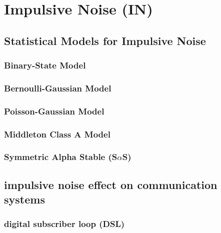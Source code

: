 	\section {Impulsive Noise (IN) } \label{sec2:IN}
		\subsection{Statistical Models for Impulsive Noise}
			\subsubsection{Binary-State Model}
			\subsubsection{Bernoulli-Gaussian Model}
			\subsubsection{Poisson-Gaussian Model}
			\subsubsection{Middleton Class A Model}
			\subsubsection{Symmetric Alpha Stable (S$\alpha$S)}
		\subsection{impulsive noise effect on communication systems}
			\subsubsection{digital subscriber loop (DSL)}
